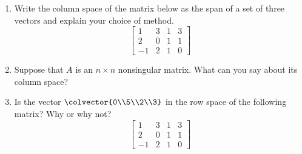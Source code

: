\begin{enumerate}
%
\item Write the column space of the matrix below as the span of a set of three
vectors and explain your choice of method.
%
\begin{equation*}
\begin{bmatrix}
1 & 3 & 1 & 3\\
2 & 0 & 1 & 1\\
-1 & 2 & 1 & 0
\end{bmatrix}
\end{equation*}
%
\item Suppose that $A$ is an $n\times n$ nonsingular matrix. What can you say about its column space?
%
\item  Is the vector $\colvector{0\\5\\2\\3}$ in the row space of the following matrix?  Why or why not?
%
\begin{equation*}
\begin{bmatrix}
1 & 3 & 1 & 3\\
2 & 0 & 1 & 1\\
-1 & 2 & 1 & 0
\end{bmatrix}
\end{equation*}
%
\end{enumerate}

